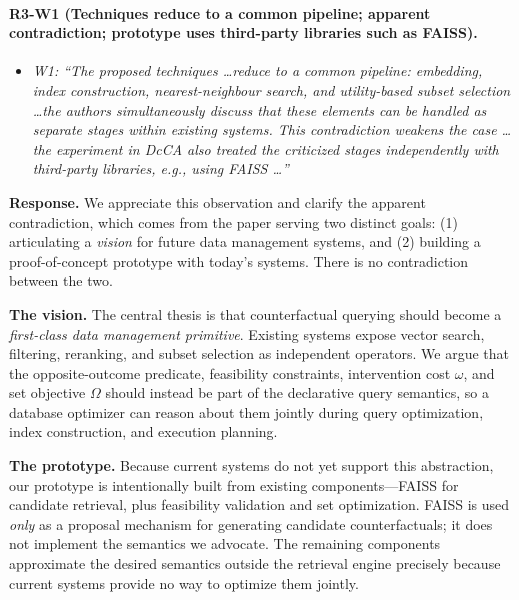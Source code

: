 \paragraph{R3-W1 (Techniques reduce to a common pipeline; apparent contradiction; prototype uses third-party libraries such as FAISS).}

\begin{itemize}[leftmargin=1.2em, itemsep=1pt, topsep=2pt]
\item \textit{W1: ``The proposed techniques \dots reduce to a common pipeline: embedding, index construction, nearest-neighbour search, and utility-based subset selection \dots the authors simultaneously discuss that these elements can be handled as separate stages within existing systems. This contradiction weakens the case \dots the experiment in DcCA also treated the criticized stages independently with third-party libraries, e.g., using FAISS \dots''}
\end{itemize}
\smallskip

\noindent\textbf{Response.}
We appreciate this observation and clarify the apparent contradiction, which comes from the paper serving two distinct goals: (1) articulating a \emph{vision} for future data management systems, and (2) building a proof-of-concept prototype with today's systems. There is no contradiction between the two.

\textbf{The vision.} The central thesis is that counterfactual querying should become a \emph{first-class data management primitive}. Existing systems expose vector search, filtering, reranking, and subset selection as independent operators. We argue that the opposite-outcome predicate, feasibility constraints, intervention cost $\omega$, and set objective $\Omega$ should instead be part of the declarative query semantics, so a database optimizer can reason about them jointly during query optimization, index construction, and execution planning.

\textbf{The prototype.} Because current systems do not yet support this abstraction, our prototype is intentionally built from existing components---FAISS for candidate retrieval, plus feasibility validation and set optimization. FAISS is used \emph{only} as a proposal mechanism for generating candidate counterfactuals; it does not implement the semantics we advocate. The remaining components approximate the desired semantics outside the retrieval engine precisely because current systems provide no way to optimize them jointly.

